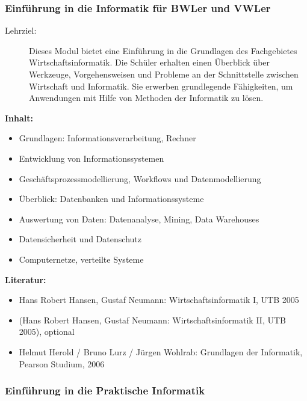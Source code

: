\documentclass[%
a4paper, %
11pt,               %
leqno,              %
fleqn,              %
]
{scrartcl}
\begin{document}

\subsubsection{Einführung in die Informatik für BWLer und VWLer} %
\label{ssub:Einführung in die Informatik für BWLer und VWLer}

\begin{description}
  \item[Lehrziel:] Dieses Modul bietet eine Einführung in die Grundlagen des
    Fachgebietes Wirtschaftsinformatik. Die Schüler erhalten einen Überblick
    über Werkzeuge, Vorgehensweisen und Probleme an der Schnittstelle zwischen
    Wirtschaft und Informatik. Sie erwerben grundlegende Fähigkeiten, um
    Anwendungen mit Hilfe von Methoden der Informatik zu lösen.
\end{description}
\textsf{\textbf{Inhalt:}}
\begin{itemize}\itemsep0pt
  \item Grundlagen: Informationsverarbeitung, Rechner
  \item Entwicklung von Informationssystemen
  \item Geschäftsprozessmodellierung, Workflows und Datenmodellierung
  \item Überblick: Datenbanken und Informationssysteme
  \item Auswertung von Daten: Datenanalyse, Mining, Data Warehouses
  \item Datensicherheit und Datenschutz
  \item Computernetze, verteilte Systeme
\end{itemize}
\textsf{\textbf{Literatur:}}
\begin{itemize}\itemsep0pt
  \item Hans Robert Hansen, Gustaf Neumann: Wirtschaftsinformatik I, UTB 2005
  \item (Hans Robert Hansen, Gustaf Neumann: Wirtschaftsinformatik II, UTB
    2005), optional
  \item Helmut Herold / Bruno Lurz / Jürgen Wohlrab: Grundlagen der Informatik,
    Pearson Studium, 2006
\end{itemize}


\subsubsection{Einführung in die Praktische Informatik} %
\label{ssub:Einführung in die Praktische Informatik}
\end{document}
